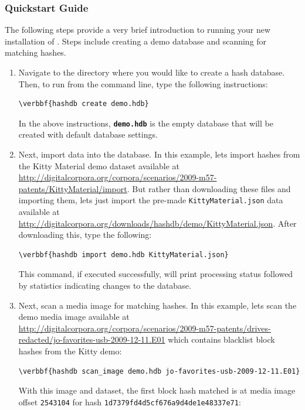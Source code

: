 \documentclass[11pt,fleqn]{article} %
\begin{document}
\subsubsection{Quickstart Guide}
The following steps provide a very brief introduction to running your new installation of \hdb. Steps include creating a demo database and scanning for matching hashes. 
\begin{enumerate}
\item Navigate to the directory where you would like to create a hash database. Then, to run \hdb from the command line, type the following instructions: 
\begin{Verbatim}[commandchars=\\\{\}]
\verbbf{hashdb create demo.hdb}
\end{Verbatim} 

In the above instructions, \texttt{\textbf{demo.hdb}} is the empty database that will be created with default database settings.

\item Next, import data into the database. In this example, lets import hashes from the Kitty Material demo dataset available at \url{http://digitalcorpora.org/corpora/scenarios/2009-m57-patents/KittyMaterial/import}. But rather than downloading these files and importing them, lets just import the pre-made \verb+KittyMaterial.json+ data available at \url{http://digitalcorpora.org/downloads/hashdb/demo/KittyMaterial.json}. After downloading this, type the following:
\begin{Verbatim}[commandchars=\\\{\}]
\verbbf{hashdb import demo.hdb KittyMaterial.json}
\end{Verbatim} 
This command, if executed successfully, will print processing status followed by statistics indicating changes to the database.

\item Next, scan a media image for matching hashes. In this example, lets scan the demo media image available at \url{ http://digitalcorpora.org/corpora/scenarios/2009-m57-patents/drives-redacted/jo-favorites-usb-2009-12-11.E01} which contains blacklist block hashes from the Kitty demo:
\begin{Verbatim}[commandchars=\\\{\}]
\verbbf{hashdb scan_image demo.hdb jo-favorites-usb-2009-12-11.E01}
\end{Verbatim} 
With this image and dataset, the first block hash matched is at media image offset \verb+2543104+ for hash \verb+1d7379fd4d5cf676a9d4de1e48337e71+:


\end{enumerate}
\end{document}
